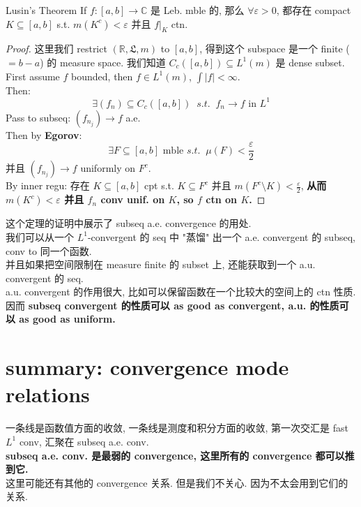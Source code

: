 \documentclass[lang=cn,11pt]{elegantbook}
\begin{document}
\begin{theorem}{Lusin's Theorem}
\label{Lusin's Theorem}
    If $f: [a,b] \rightarrow \mathbb{C}$ 是 Leb. mble 的, 那么 $\forall \varepsilon > 0$, 都存在 compact $K \subseteq [a,b]$ s.t. $m(K^c) < \varepsilon$ 并且 $f|_K$ ctn.
\end{theorem}
\begin{proof}
这里我们 restrict $(\mathbb{R}, \mathfrak{L},m)$ to $[a,b]$, 得到这个 subspace 是一个 finite ($=b-a$) 的 measure space. 
我们知道 $C_c([a,b]) \subseteq L^1(m)$ 是 dense subset.\\
First assume $f$ bounded, then $f\in L^1(m)$, $\int|f| < \infty$.\\
Then: \[\exists (f_n)  \subseteq C_c ([a,b])  \;\;s.t. \;\; f_n\rightarrow f \text{ in } L^1 \]
Pass to subseq: $(f_{n_j})\rightarrow f$ a.e.\\
Then by \textbf{Egorov}: \[
\exists F \subseteq [a,b] \text{ mble } s.t. \;\; \mu(F) < \frac{\varepsilon}{2}
\]
并且 $(f_{n_j})\rightarrow f$ uniformly on $F^c$.\\
By inner regu: 存在 $K \subseteq [a,b] $ cpt s.t. $K \subseteq F^c$ 并且 $m(F^c \setminus K ) < \frac{\varepsilon}{2}$, \textbf{从而 $m(K^c) < \varepsilon$ 并且 $f_n$ conv unif. on $K$, so $f$ ctn on $K$.}
\end{proof}
\begin{remark}
    这个定理的证明中展示了 subseq a.e. convergence 的用处. \\
    我们可以从一个 $L^1$-convergent 的 seq 中 "蒸馏" 出一个 a.e. convergent 的 subseq, conv to 同一个函数. \\
    并且如果把空间限制在 measure finite 的 subset 上, 还能获取到一个 a.u. convergent 的 seq.\\ 
    a.u. convergent 的作用很大, 比如可以保留函数在一个比较大的空间上的 ctn 性质.\\
    因而 \textbf{subseq convergent 的性质可以 as good as convergent, a.u. 的性质可以 as good as uniform.}
\end{remark}


\section{summary: convergence mode relations}
一条线是函数值方面的收敛, 一条线是测度和积分方面的收敛,  第一次交汇是 fast $L^1$ conv, 汇聚在 subseq a.e. conv. \\
\textbf{subseq a.e. conv. 是最弱的 convergence, 这里所有的 convergence 都可以推到它.}\\
这里可能还有其他的 convergence 关系. 但是我们不关心. 因为不太会用到它们的关系.
\end{document}
